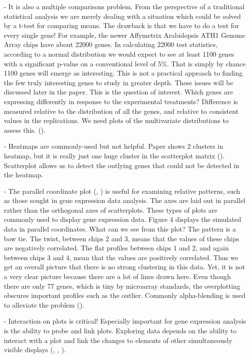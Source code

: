 \documentclass[11pt,a4paper,oldfontcommands,openany]{memoir}
\numberwithin{equation}{section} %
\begin{document}
- It is also a multiple comparisons problem. From the perspective of a traditional statistical analysis we are merely dealing with a situation which could be solved by a t-test for comparing means. The drawback is that we have to do a test for every single gene! For example, the newer Affymetrix Arabidopsis ATH1 Genome Array chips have about 22000 genes. In calculating 22000 test statistics, according to a normal distribution we would expect to see at least 1100 genes with a significant p-value on a conventional level of 5\%. That is simply by chance 1100 genes will emerge as interesting. This is not a practical approach to finding the few truly interesting genes to study in greater depth. These issues will be discussed later in the paper. This is the question of interest. Which genes are expressing differently in response to the experimental treatments? Difference is measured relative to the distribution of all the genes, and relative to consistent values in the replications. We need plots of the multivariate distributions to assess this. (\citealt{jds}).

- Heatmaps are commonly-used but not helpful. Paper shows 2 clusters in heatmap, but it is really just one huge cluster in the scatterplot matrix (\citealt{jds}). Scatterplot allows us to detect the outlying genes that could not be detected in the heatmap.

- The parallel coordinate plot (\citealt{origPCP}, \citealt{origPCP2}) is useful for examining relative patterns, such as those sought in gene expression data analysis. The axes are laid out in parallel rather than the orthogonal axes of scatterplots. These types of plots are commonly used to display gene expression data. Figure 4 displays the simulated data in parallel coordinates. What can we see from this plot? The pattern is a bow tie. The twist, between chips 2 and 3, means that the values of these chips are negatively correlated. The flat profiles between chips 1 and 2, and again between chips 3 and 4, mean that the values are positively correlated. Thus we get an overall picture that there is no strong clustering in this data. Yet, it is not a very clear picture because there are a lot of lines drawn here. Even though there are only 77 genes, which is tiny by microarray standards, the overplotting obscures important profiles such as the outlier. Commonly alpha-blending is used to alleviate the problem (\citealt{jds}).

- Interaction on plots is critical! Especially important for gene expression analysis is the ability to probe and link plots. Exploring data depends on the ability to interact with a plot and link the changes to elements of other simultaneously visible displays (\citealt{interact}, \citealt{interact2}, \citealt{interact3}).
\end{document}
